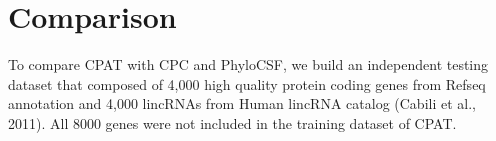 \documentclass[letterpaper,10pt,english]{sphinxmanual}
\begin{document}
\chapter{Comparison}
\label{index:comparison}
To compare CPAT with CPC and PhyloCSF, we build an independent testing dataset that composed
of 4,000 high quality protein coding genes from Refseq annotation and 4,000 lincRNAs from
Human lincRNA catalog (Cabili et al., 2011). All 8000 genes were not included in the training
dataset of CPAT.
\begin{figure}[htbp]
\centering

\end{figure}
\end{document}
